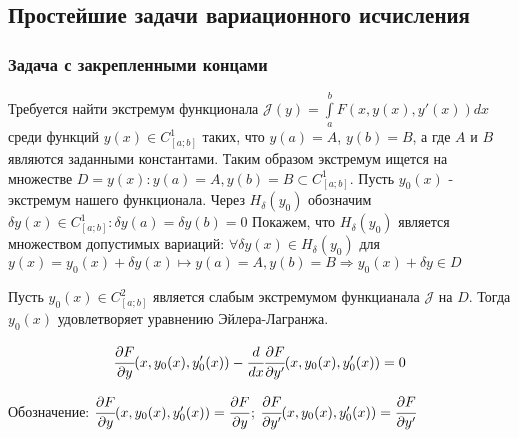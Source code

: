     \subsection{Простейшие задачи вариационного исчисления}
    \subsubsection{Задача с закрепленными концами}

    Требуется найти экстремум функционала $\mathcal{J} (y) = \int \limits^b_a F(x, y(x), y'(x)) dx$ среди функций $y(x) \in C^1_{[a;b]}$ таких, что $y(a) = A$, $y(b) = B$, а где $A$ и $B$ являются заданными константами.
    Таким образом экстремум ищется на множестве $D = {y(x): y(a) = A, y(b) = B} \subset C^1_{[a;b]}$. Пусть $y_0(x)$ - экстремум нашего функционала. 
    Через $H_{\delta}(y_0)$ обозначим ${ \delta y(x) \in C^1_{[a;b]}: \delta y(a) = \delta y(b) = 0}$ 
    Покажем, что $H_{\delta}(y_0)$ является множеством допустимых вариаций: $\forall \delta y(x) \in H_{\delta}(y_0)$ для $y(x) = y_0(x) + \delta y(x) \mapsto y(a) = A, y(b) = B \Rightarrow y_0(x) + \delta y \in D$
    
    \begin{theorem}
        Пусть $y_0(x) \in C^2_{[a;b]}$ является слабым экстремумом функцианала $\mathcal{J}$ на $D$. Тогда $y_0(x)$ удовлетворяет уравнению Эйлера-Лагранжа.
        
        \begin{equation} \label{issue15:IF}
            \cfrac{\partial F}{\partial y}(x, y_0(x), y'_0(x)) - \cfrac{d}{dx} \cfrac{\partial F}{\partial y'} (x, y_0(x), y'_0(x)) = 0
        \end{equation}

        Обозначение: $\cfrac{\partial F}{\partial y}(x, y_0(x), y'_0(x)) = \cfrac{\partial F}{\partial y}$; $\cfrac{\partial F}{\partial y'} (x, y_0(x), y'_0(x)) = \cfrac{\partial F}{\partial y'}$

    \end{theorem}

